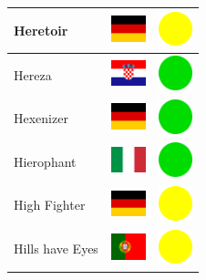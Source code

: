 \documentclass[12pt, a4paper, twoside]{report}
\begin{document}
\begin{center}
\begin{longtable}{|p{5cm}|p{2cm}|p{2cm}|}
 Heretoir                                                   & \includegraphics[width=1cm]{4x3/de} &   \includegraphics[width=1cm]{likes/m} \\ \hline
 Hereza                                                     & \includegraphics[width=1cm]{4x3/hr} &   \includegraphics[width=1cm]{likes/y} \\ \hline
 Hexenizer                                                  & \includegraphics[width=1cm]{4x3/de} &   \includegraphics[width=1cm]{likes/y} \\ \hline
 Hierophant                                                 & \includegraphics[width=1cm]{4x3/it} &   \includegraphics[width=1cm]{likes/y} \\ \hline
 High Fighter                                               & \includegraphics[width=1cm]{4x3/de} &   \includegraphics[width=1cm]{likes/m} \\ \hline
 Hills have Eyes                                            & \includegraphics[width=1cm]{4x3/pt} &   \includegraphics[width=1cm]{likes/m} \\ \hline

\end{longtable}
\end{center}
\end{document}
